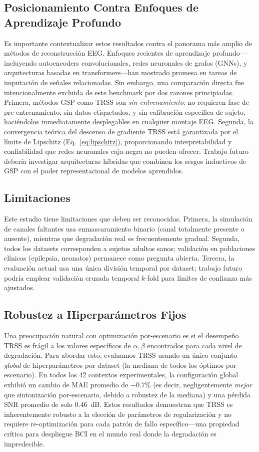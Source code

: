 \subsection{Posicionamiento Contra Enfoques de Aprendizaje Profundo}
Es importante contextualizar estos resultados contra el panorama más amplio de métodos de reconstrucción EEG. Enfoques recientes de aprendizaje profundo---incluyendo autoencoders convolucionales, redes neuronales de grafos (GNNs), y arquitecturas basadas en transformers---han mostrado promesa en tareas de imputación de señales relacionadas. Sin embargo, una comparación directa fue intencionalmente excluida de este benchmark por dos razones principiadas. Primera, métodos GSP como TRSS son \emph{sin entrenamiento}: no requieren fase de pre-entrenamiento, sin datos etiquetados, y sin calibración específica de sujeto, haciéndolos inmediatamente desplegables en cualquier montaje EEG. Segunda, la convergencia teórica del descenso de gradiente TRSS está garantizada por el límite de Lipschitz (Eq.~\ref{eq:lipschitz}), proporcionando interpretabilidad y confiabilidad que redes neuronales caja-negra no pueden ofrecer. Trabajo futuro debería investigar arquitecturas híbridas que combinen los sesgos inductivos de GSP con el poder representacional de modelos aprendidos.

\subsection{Limitaciones}
Este estudio tiene limitaciones que deben ser reconocidas. Primera, la simulación de canales faltantes usa enmascaramiento binario (canal totalmente presente o ausente), mientras que degradación real es frecuentemente gradual. Segunda, todos los datasets corresponden a sujetos adultos sanos; validación en poblaciones clínicas (epilepsia, neonatos) permanece como pregunta abierta. Tercera, la evaluación actual usa una única división temporal por dataset; trabajo futuro podría emplear validación cruzada temporal $k$-fold para límites de confianza más ajustados.

\subsection{Robustez a Hiperparámetros Fijos}
Una preocupación natural con optimización por-escenario es si el desempeño TRSS es frágil a los valores específicos de $\alpha, \beta$ encontrados para cada nivel de degradación. Para abordar esto, evaluamos TRSS usando un único conjunto \emph{global} de hiperparámetros por dataset (la mediana de todos los óptimos por-escenario). En todos los 42 contextos experimentales, la configuración global exhibió un cambio de MAE promedio de $-0.7\%$ (es decir, negligentemente \emph{mejor} que sintonización por-escenario, debido a robustez de la mediana) y una pérdida SNR promedio de solo $0.46$~dB. Estos resultados demuestran que TRSS es inherentemente robusto a la elección de parámetros de regularización y no requiere re-optimización para cada patrón de fallo específico---una propiedad crítica para despliegue BCI en el mundo real donde la degradación es impredecible.

